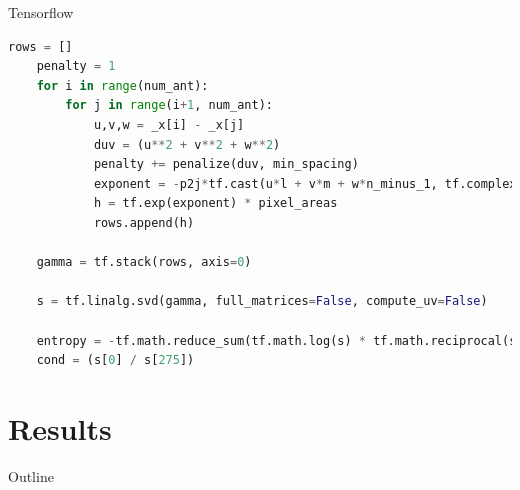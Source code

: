 \documentclass[ignorenonframetext]{beamer}
\begin{document}
\begin{frame}[fragile]{Tensorflow}
\begin{lstlisting}[language=Python, ]
    rows = []
    penalty = 1
    for i in range(num_ant):
        for j in range(i+1, num_ant):
            u,v,w = _x[i] - _x[j]
            duv = (u**2 + v**2 + w**2)
            penalty += penalize(duv, min_spacing)
            exponent = -p2j*tf.cast(u*l + v*m + w*n_minus_1, tf.complex128)
            h = tf.exp(exponent) * pixel_areas
            rows.append(h)
    
    gamma = tf.stack(rows, axis=0)

    s = tf.linalg.svd(gamma, full_matrices=False, compute_uv=False)

    entropy = -tf.math.reduce_sum(tf.math.log(s) * tf.math.reciprocal(s))
    cond = (s[0] / s[275])
\end{lstlisting}
\end{frame}


\section{Results}

\begin{frame}{Outline}
\tableofcontents[currentsection]
\end{frame}
\end{document}
